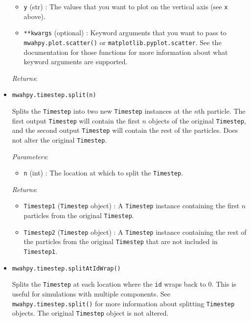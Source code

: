 \documentclass{article}
\begin{document}
\begin{itemize}
\begin{itemize}
\item \verb!y! (str) : The values that you want to plot on the vertical axis (see \verb!x! above).

\item \verb!**kwargs! (optional) : Keyword arguments that you want to pass to \verb!mwahpy.plot.scatter()! or \verb!matplotlib.pyplot.scatter!. See the documentation for those functions for more information about what keyword arguments are supported.

\end{itemize}

\textit{Returns}: 



\item \verb!mwahpy.timestep.split(n)!

Splits the \verb!Timestep! into two new \verb!Timestep! instances at the $n$th particle. The first output \verb!Timestep! will contain the first $n$ objects of the original \verb!Timestep!, and the second output \verb!Timestep! will contain the rest of the particles. Does not alter the original \verb!Timestep!. 

\textit{Parameters}: \begin{itemize}

\item \verb!n! (int) : The location at which to split the \verb!Timestep!. 

\end{itemize}

\textit{Returns}:  \begin{itemize}

\item \verb!Timestep1! (\verb!Timestep! object) : A \verb!Timestep! instance containing the first $n$ particles from the original \verb!Timestep!.

\item \verb!Timestep2! (\verb!Timestep! object) : A \verb!Timestep! instance containing the rest of the particles from the original \verb!Timestep! that are not included in \verb!Timestep1!.

\end{itemize}



\item \verb!mwahpy.timestep.splitAtIdWrap()!

Splits the \verb!Timestep! at each location where the \verb!id! wraps back to 0. This is useful for simulations with multiple components. See \verb!mwahpy.timestep.split()! for more information about splitting \verb!Timestep! objects. The original \verb!Timestep! object is not altered.


\end{itemize}
\end{document}
